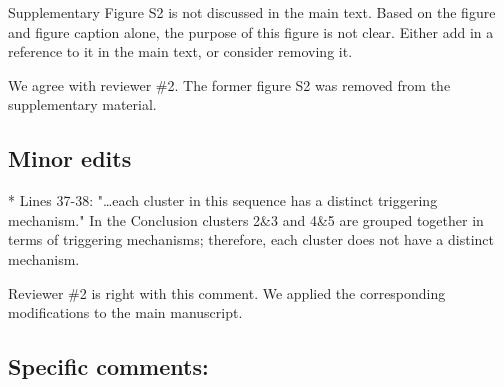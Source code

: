 \documentclass[10pt]{extarticle}
\begin{document}
\begin{ReviewerComment}{2}
\noindent 
Supplementary Figure S2 is not discussed in the main text. Based on the figure and figure caption alone, the purpose of this figure is not clear. Either add in a reference to it in the main text, or consider removing it.

\end{ReviewerComment}


\begin{Answer}
We agree with reviewer \#2. The former figure S2 was removed from the supplementary material.
 \WorkInProgressRevTask
\end{Answer}
%
%


\subsection*{Minor edits}

\begin{ReviewerComment}{2}
\noindent 
*        Lines 37-38: "…each cluster in this sequence has a distinct triggering mechanism." In the Conclusion clusters 2\&3 and 4\&5 are grouped together in terms of triggering mechanisms; therefore, each cluster does not have a distinct mechanism.  

\end{ReviewerComment}


\begin{Answer}
Reviewer \#2 is right with this comment. We applied the corresponding modifications to the main manuscript.
 \WorkInProgressRevTask
\end{Answer}
%
%



\subsection*{Specific comments:}
\end{document}
